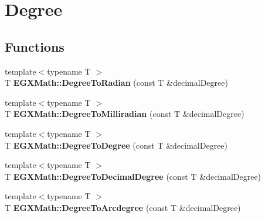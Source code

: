 \hypertarget{group___e_g_x_math-_angle_conversions-_degree}{}\section{Degree}
\label{group___e_g_x_math-_angle_conversions-_degree}
\subsection*{Functions}
\begin{DoxyCompactItemize}
\item 
\mbox{\label{group___e_g_x_math-_angle_conversions-_degree_ga48585541b228c852c9d08a9eac3682f0}} 
{\footnotesize template$<$typename T $>$ }\\T {\bfseries E\+G\+X\+Math\+::\+Degree\+To\+Radian} (const T \&decimal\+Degree)
\item 
\mbox{\label{group___e_g_x_math-_angle_conversions-_degree_gae4fa6c2d3805430760783650cfbfdb11}} 
{\footnotesize template$<$typename T $>$ }\\T {\bfseries E\+G\+X\+Math\+::\+Degree\+To\+Milliradian} (const T \&decimal\+Degree)
\item 
\mbox{\label{group___e_g_x_math-_angle_conversions-_degree_gaca157e7d3e99a46a11a04b92680d2574}} 
{\footnotesize template$<$typename T $>$ }\\T {\bfseries E\+G\+X\+Math\+::\+Degree\+To\+Degree} (const T \&decimal\+Degree)
\item 
\mbox{\label{group___e_g_x_math-_angle_conversions-_degree_ga568afc1d436d425bf5d4edea584aee08}} 
{\footnotesize template$<$typename T $>$ }\\T {\bfseries E\+G\+X\+Math\+::\+Degree\+To\+Decimal\+Degree} (const T \&decimal\+Degree)
\item 
\mbox{\label{group___e_g_x_math-_angle_conversions-_degree_gac1b5f3b68f66c77a6df4ceef842c9b19}} 
{\footnotesize template$<$typename T $>$ }\\T {\bfseries E\+G\+X\+Math\+::\+Degree\+To\+Arcdegree} (const T \&decimal\+Degree)
\item 

\end{DoxyCompactItemize}
